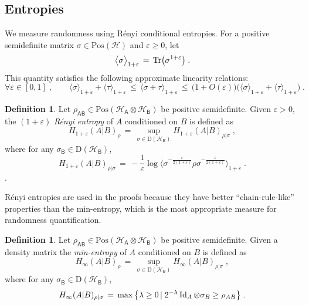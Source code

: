 \documentclass[11pt]{article}
\theoremstyle{remark}
\theoremstyle{definition}
\newtheorem{definition}[theorem]{Definition}
\newcommand{\Tr}{\mbox{\rm Tr}}
\newcommand{\Id}{\ensuremath{\mathop{\rm Id}\nolimits}}
\newcommand{\reg}[1]{{\textsf{#1}}}
\newcommand{\mH}{\mathcal{H}}
\newcommand{\setft}[1]{\mathrm{#1}}
\newcommand{\Density}{\setft{D}}
\newcommand{\Pos}{\setft{Pos}}
\newcommand{\eps}{\varepsilon}
\newcommand{\Hmin}{H_\infty}
\begin{document}
\subsection{Entropies}

We measure randomness using R\'enyi conditional entropies. For a positive semidefinite matrix $\sigma\in\Pos(\mH)$ and $\eps\geq 0$, let 
$$\big\langle \sigma \big\rangle_{1+\eps} \,=\, \Tr \big(\sigma^{1+\eps}\big)\;.$$
This quantity satisfies the following approximate linearity relations:
\begin{equation}\label{eq:approx-lin}
 \forall\eps\in[0,1]\;,\qquad\langle \sigma \rangle_{1+\eps} + \langle \tau \rangle_{1+\eps} \,\leq\, \langle \sigma + \tau \rangle_{1+\eps} \,\leq\, \big(1+O(\eps)\big) \big( \langle \sigma \rangle_{1+\eps}+\langle \tau \rangle_{1+\eps}\big)\;.
\end{equation}

\begin{definition}\label{def:renyi}
Let $\rho_\reg{AB} \in \Pos(\mH_\reg{A}\otimes \mH_\reg{B})$ be positive semidefinite.  Given $\eps >0$, the $(1+\eps)$ \emph{R\'enyi entropy} of $A$ conditioned on $B$ is defined as 
$$H_{1+\eps}(A|B)_{\rho} \,=\, \sup_{\sigma\in\Density(\mH_\reg{B})} H_{1+\eps}(A|B)_{\rho|\sigma}\;,$$
where for any  $\sigma_\reg{B}\in\Density(\mH_\reg{B})$,
$$H_{1+\eps}(A|B)_{\rho|\sigma} \,=\, -\frac{1}{\eps} \log \big\langle \sigma^{-\frac{\eps}{2(1+\eps)}}\rho\sigma^{-\frac{\eps}{2(1+\eps)}}\big\rangle_{1+\eps}\;.$$.
\end{definition}

R\'enyi entropies are used in the proofs because they have better ``chain-rule-like'' properties than the min-entropy, which is the most appropriate measure for randomness quantification. 

\begin{definition}\label{def:min-entropy}
Let $\rho_\reg{AB} \in \Pos(\mH_\reg{A}\otimes \mH_\reg{B})$ be positive semidefinite.  Given a density matrix  the \emph{min-entropy} of $A$ conditioned on $B$ is defined as
$$\Hmin(A|B)_\rho \,=\, \sup_{\sigma\in\Density(\mH_\reg{B})} \Hmin(A|B)_{\rho|\sigma}\;,$$
where for any $\sigma_\reg{B}\in \Density(\mH_\reg{B})$,
  \begin{equation*}
    \Hmin({A|B})_{\rho|\sigma} \,=\, \max \big\{\lambda \geq 0 \,|\; 2^{-\lambda} \Id_A \otimes \sigma_B \geq \rho_{AB}\big\}\;.
  \end{equation*}
\end{definition}
\end{document}
